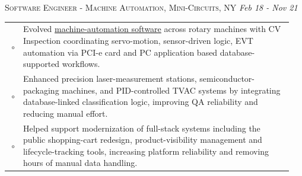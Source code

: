 \documentclass[a4paper]{article}
\newcommand{\SpaceBetweenJobs}{\vspace{-1em}}
\begin{document}
%
	
\noindent
\hspace*{-2em}
\colorbox{gray!15}{
    \parbox[c][0.6em][c]{1.05\linewidth}{
        \faBriefcase\;\textsc{Software Engineer - Machine Automation, Mini-Circuits, NY}
        \hfill \emph{Feb 18 - Nov 21}
    }
}
{\color{previousWork}
\begin{tabular}{r p{0.95\linewidth}}
$\circ$	&	{\fontspec{Inter}	Evolved \underline{machine-automation software} across rotary machines with CV Inspection coordinating servo-motion, sensor-driven logic, EVT automation via PCI-e card and PC application based database-supported workflows.	}	\\
$\circ$	&	{\fontspec{Inter}	Enhanced precision laser-measurement stations, semiconductor-packaging machines, and PID-controlled TVAC systems by integrating database-linked classification logic, improving QA reliability and reducing manual effort.	}	\\
$\circ$	&	{\fontspec{Inter}	Helped support modernization of full-stack systems including the public shopping-cart redesign, product-visibility management and lifecycle-tracking tools, increasing platform reliability and removing hours of manual data handling.	}	\\
\end{tabular}
}

\SpaceBetweenJobs
\end{document}
